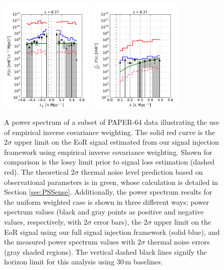 \documentclass[preprint2,numberedappendix,tighten]{aastex6}  %
\begin{document}
\begin{figure}
	\centering
	\includegraphics[width=0.4\textwidth]{plots/ps1_data.pdf}
	\includegraphics[width=0.4\textwidth]{plots/ps2_data.pdf}
	\caption{A power spectrum of a subset of PAPER-64 data illustrating the use of empirical inverse covariance weighting. The solid red curve is the $2\sigma$ upper limit on the EoR signal estimated from our signal injection framework using empirical inverse covariance weighting. Shown for comparison is the lossy limit prior to signal loss estimation (dashed red). The theoretical $2\sigma$ thermal noise level prediction based on observational parameters is in green, whose calculation is detailed in Section \ref{sec:PSSense}. Additionally, the power spectrum results for the uniform weighted case is shown in three different ways: power spectrum values (black and gray points as positive and negative values, respectively, with $2\sigma$ error bars), the $2\sigma$ upper limit on the EoR signal using our full signal injection framework (solid blue), and the measured power spectrum values with $2\sigma$ thermal noise errors (gray shaded regions). The vertical dashed black lines signify the horizon limit for this analysis using $30$\,m baselines.}
\label{fig:ps2_data}
\end{figure}
\end{document}
